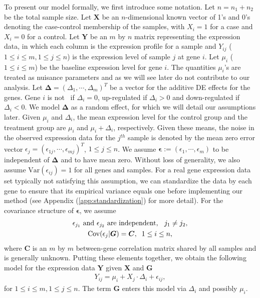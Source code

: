 	To present our model formally, we first introduce some notation. Let $n=n_1+n_2$ be the total
	sample size. Let $\bm X$ be an $n$-dimensional known vector of 1's and 0's denoting the 
	case-control membership of the samples, with $X_i=1$ for a case and $X_i=0$ for a control. Let 
	$\bm Y$ be an $m$ by $n$ matrix representing the expression data, in which each column is the 
	expression profile for a sample and $Y_{ij}$ ($1\le i\le m, 1\le j\le n$) is the expression 
	level of sample $j$ at gene	$i$. Let $\mu_i$ ($1\le i\le m$) be the baseline expression 
	level for gene $i$. The quantities $\mu_i$'s are treated as nuisance parameters and as we will 
	see later do not contribute to our analysis. Let $\bm \Delta=(\Delta_1, \cdots, \Delta_m)^T$ be 
	a vector for the additive DE effects for the genes. Gene $i$ is not \DED~if $\Delta_i=0$, 
	up-regulated if $\Delta_i >0 $ and down-regulated if $\Delta_i<0$. We model $\bm \Delta$ as a 
	random effect, for which we will detail our assumptions later. Given $\mu_i$ and $\Delta_i$, 
	the mean expression level for the control group and the treatment group are $\mu_i$ and 
	$\mu_i+\Delta_i$, respectively. Given these means, the noise in the observed expression data 
	for the $j^{th}$ sample is denoted by the mean zero error vector 
	$\epsilon_j=(\epsilon_{1j},\cdots,\epsilon_{mj})^T$, $1\le j\le n$. We assume
	$\bm\epsilon:=(\epsilon_1,\cdots,\epsilon_m)$ to be independent of $\bm \Delta$ and to have mean
	zero. Without loss of generality, we also assume $\mbox{Var}(\epsilon_{ij})=1$ for all genes and
	samples. For a real gene expression data set typically not satisfying this assumption, we can
	standardize the data by each gene to ensure that its empirical variance equals one before 
	implementing our method (see Appendix (\ref{app:standardization}) for more detail). For the 
	covariance structure of $\bm \epsilon$, we assume 
	\begin{gather}
	\text{$\epsilon_{j_1}$ and $\epsilon_{j_2}$ are independent, \;\;$j_1\ne
		j_2$},\label{eq:gene_indep}\\
	\mbox{Cov}(\epsilon_j|\bm G)=\bm C, \;\;1\le i\le n,\label{eq:gene_cor}
	\end{gather}
	where $\bm C$ is an $m$ by $m$ between-gene correlation matrix shared by all samples and is
	generally unknown. Putting these elements together, we obtain the following model for the 
	expression data $\bm Y$ given $\bm X$ and $\bm G$ 
	\begin{align}
	\label{eq:Ymodel}
	Y_{ij} = \mu_i + X_j\cdot\Delta_i + \epsilon_{ij},
	\end{align}
	for $1\le i\le m, 1\le j\le n$. The term $\bm G$ enters this model via $\Delta_i$ and possibly 
	$\mu_i$.
	
